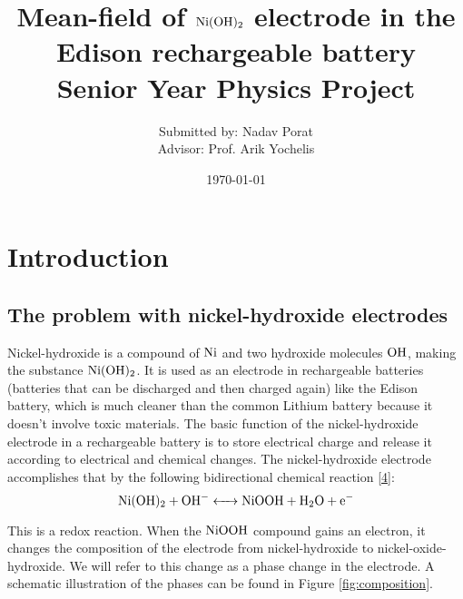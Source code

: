 \documentclass[12pt]{article}
\begin{document}
\title{
\vspace{0cm}
\LARGE{{\bf Mean-field of $\ce{Ni(OH)_2}$ electrode in the Edison rechargeable battery} \\ \vspace{0.5cm}
{\Large Senior Year Physics Project}
\vspace{2cm}
}
}


\author{Submitted by: Nadav Porat \\ Advisor: Prof. Arik Yochelis }








\date{\today}
\maketitle



\pagebreak
\tableofcontents
\pagebreak
\section{Introduction} 


\subsection{The problem with nickel-hydroxide electrodes} \label{sec:Nickel hydroxide}
Nickel-hydroxide is a compound of $\ce{Ni}$ and two hydroxide molecules $\ce{OH}$, making the substance $\ce{Ni(OH)_2}$. It is used as an electrode in rechargeable batteries (batteries that can be discharged and then charged again) like the Edison battery, which is much cleaner than the common Lithium battery because it doesn't involve toxic materials.
The basic function of the nickel-hydroxide electrode in a rechargeable battery is to store electrical charge and release it according to electrical and chemical changes. The nickel-hydroxide electrode accomplishes that by the following bidirectional chemical reaction \hyperlink{c:4}{[4]}:
\begin{equation} \label{eq:reaction}
    \ce{Ni(OH)_2 + OH^- <-> NiOOH + H_2O + e^- }
\end{equation} \label{eq:11}

This is a redox reaction. When the $\ce{NiOOH}$ compound gains an electron, it changes the composition of the electrode from nickel-hydroxide to nickel-oxide-hydroxide. We will refer to this change as a phase change in the electrode. A schematic illustration of the phases can be found in Figure \ref{fig:composition}.
\end{document}
